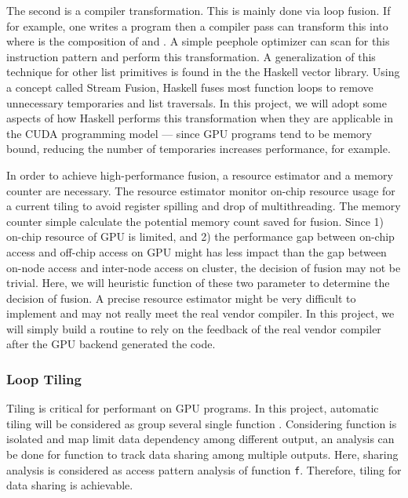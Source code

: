 The second is a compiler transformation. This is mainly done via loop
fusion. If for example, one writes a program
 then a compiler pass can transform this
into  where  is the composition of
 and . A simple peephole optimizer can scan for this
instruction pattern and perform this transformation. A generalization of
this technique for other list primitives is found in the the Haskell
vector library. Using a concept called Stream Fusion\cite{StreamFusion}, Haskell
fuses most function loops to remove unnecessary temporaries and list
traversals. In this project, we will adopt some aspects of how Haskell
performs this transformation when they are applicable in the CUDA
programming model --- since GPU programs tend to be memory bound,
reducing the number of temporaries increases performance, for example.

In order to achieve high-performance fusion, a resource estimator and a
memory counter are necessary. The resource estimator monitor on-chip
resource usage for a current tiling to avoid register spilling and drop
of multithreading. The memory counter simple calculate the potential
memory count saved for fusion. Since 1) on-chip resource of GPU is
limited, and 2) the performance gap between on-chip access and off-chip
access on GPU might has less impact than the gap between on-node access
and inter-node access on cluster, the decision of fusion may not be
trivial. Here, we will heuristic function of these two parameter to
determine the decision of fusion. A precise resource estimator might be
very difficult to implement and may not really meet the real vendor
compiler. In this project, we will simply build a routine to rely on the
feedback of the real vendor compiler after the GPU backend generated the
code.

\subsubsection{Loop Tiling}\label{loop-tiling}

Tiling is critical for performant on GPU programs. In this project,
automatic tiling will be considered as group several single function
. Considering function  is isolated and map limit
data dependency among different output, an analysis can be done for
function  to track data sharing among multiple outputs. Here,
sharing analysis is considered as access pattern analysis of function
\texttt{f}. Therefore, tiling for data sharing is achievable.


